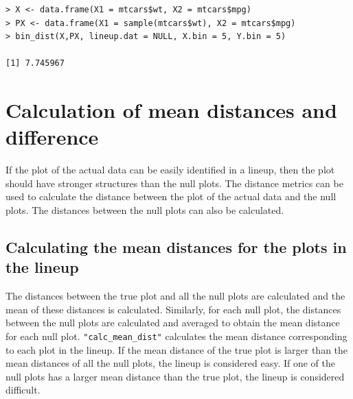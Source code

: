\begin{verbatim}
> X <- data.frame(X1 = mtcars$wt, X2 = mtcars$mpg)
> PX <- data.frame(X1 = sample(mtcars$wt), X2 = mtcars$mpg)
> bin_dist(X,PX, lineup.dat = NULL, X.bin = 5, Y.bin = 5)

[1] 7.745967
\end{verbatim}

\section{Calculation of mean distances and difference}

If the plot of the actual data can be easily identified in a lineup, then the plot should have stronger structures than the null plots. The distance metrics can be used to calculate the distance between the plot of the actual data and the null plots. The distances between the null plots can also be calculated. 

\subsection{Calculating the mean distances for the plots in the
lineup}\label{calculating-the-mean-distances-for-the-plots-in-the-lineup}

The distances between the true
plot and all the null plots are calculated and the mean of these
distances is calculated. Similarly, for each null plot, the distances
between the null plots are calculated and
averaged to obtain the mean distance for each null plot.
\texttt{"calc\_mean\_dist"} calculates the mean distance corresponding
to each plot in the lineup. If the mean distance of the true plot is
larger than the mean distances of all the null plots, the lineup is
considered easy. If one of the null plots has a larger mean distance
than the true plot, the lineup is considered difficult.

